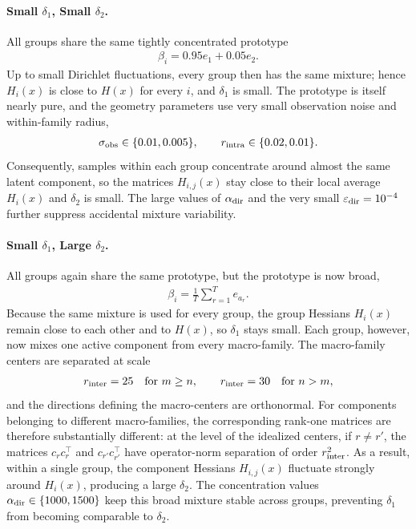 \documentclass{article}
\theoremstyle{plain}
\begin{document}
\paragraph{Small $\delta_1$, Small $\delta_2$.}
All groups share the same tightly concentrated prototype
\begin{align*}
    \beta_i = 0.95e_1+0.05e_2.
\end{align*}
Up to small Dirichlet fluctuations, every group then has the same mixture; hence $H_i(x)$ is close to $H(x)$ for every $i$, and $\delta_1$ is small. The prototype is itself nearly pure, and the geometry parameters use very small observation noise and within-family radius,
\begin{align*}
    \sigma_{\rm obs}\in\{0.01,0.005\},
    \qquad
    r_{\rm intra}\in\{0.02,0.01\}.
\end{align*}
Consequently, samples within each group concentrate around almost the same latent component, so the matrices $H_{i,j}(x)$ stay close to their local average $H_i(x)$ and $\delta_2$ is small. The large values of $\alpha_{\rm dir}$ and the very small $\varepsilon_{\rm dir}=10^{-4}$ further suppress accidental mixture variability.

\paragraph{Small $\delta_1$, Large $\delta_2$.}
All groups again share the same prototype, but the prototype is now broad,
\begin{align*}
    \beta_i
    =
    \frac1T\sum_{r=1}^T e_{a_r}.
\end{align*}
Because the same mixture is used for every group, the group Hessians $H_i(x)$ remain close to each other and to $H(x)$, so $\delta_1$ stays small. Each group, however, now mixes one active component from every macro-family. The macro-family centers are separated at scale
\begin{align*}
    r_{\rm inter}=25
    \quad\text{for } m\ge n,
    \qquad
    r_{\rm inter}=30
    \quad\text{for } n>m,
\end{align*}
and the directions defining the macro-centers are orthonormal. For components belonging to different macro-families, the corresponding rank-one matrices are therefore substantially different: at the level of the idealized centers, if $r\neq r'$, the matrices $c_rc_r^\top$ and $c_{r'}c_{r'}^\top$ have operator-norm separation of order $r_{\rm inter}^2$. As a result, within a single group, the component Hessians $H_{i,j}(x)$ fluctuate strongly around $H_i(x)$, producing a large $\delta_2$. The concentration values $\alpha_{\rm dir}\in\{1000,1500\}$ keep this broad mixture stable across groups, preventing $\delta_1$ from becoming comparable to $\delta_2$.
\end{document}
